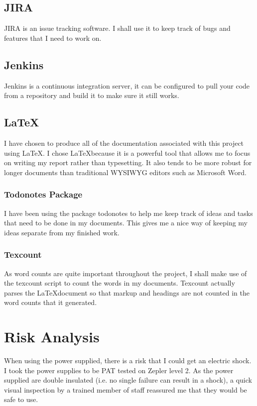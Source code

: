 \documentclass[12pt]{report}
\begin{document}
\subsection{JIRA}
JIRA is an issue tracking software. I shall use it to keep track of bugs and
features that I need to work on. 

\subsection{Jenkins}
Jenkins is a continuous integration server, it can be configured to pull your
code from a repository and build it to make sure it still works.  

\subsection{\LaTeX}
I have chosen to produce all of the documentation associated with this project
using \LaTeX. I chose \LaTeX because it is a powerful tool that allows me to
focus on writing my report rather than typesetting. It also tends to be more
robust for longer documents than traditional WYSIWYG editors such as Microsoft
Word.

\subsubsection{Todonotes Package}
I have been using the package todonotes to help me keep track of ideas and tasks 
that need to be done in my documents. This gives me a nice way of keeping my
ideas separate from my finished work.

\subsubsection{Texcount}
As word counts are quite important throughout the project, I shall make use of
the texcount script to count the words in my documents. Texcount actually parses
the \LaTeX document so that markup and headings are not counted in the word
counts that it generated. 

\section{Risk Analysis}

When using the power supplied, there is a risk that I could get an electric
shock. I took the power supplies to be PAT tested on Zepler level 2. As the
power supplied are double insulated (i.e. no single failure can result in a
shock), a quick visual inspection by a trained member of staff reassured me that
they would be safe to use. 
\end{document}
